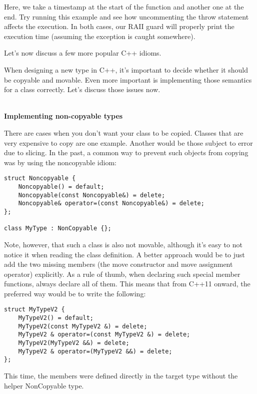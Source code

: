 Here, we take a timestamp at the start of the function and another one at the end. Try running this example and see how uncommenting the throw statement affects the execution. In both cases, our RAII guard will properly print the execution time (assuming the exception is caught somewhere).

Let's now discuss a few more popular C++ idioms.


When designing a new type in C++, it's important to decide whether it should be copyable and movable. Even more important is implementing those semantics for a class correctly. Let's discuss those issues now.

\hspace*{\fill} \\ %
\noindent
\textbf{Implementing non-copyable types}

There are cases when you don't want your class to be copied. Classes that are very expensive to copy are one example. Another would be those subject to error due to slicing. In the past, a common way to prevent such objects from copying was by using the noncopyable idiom:

\begin{lstlisting}[style=styleCXX]
struct Noncopyable {
	Noncopyable() = default;
	Noncopyable(const Noncopyable&) = delete;
	Noncopyable& operator=(const Noncopyable&) = delete;
};

class MyType : NonCopyable {};
\end{lstlisting}

Note, however, that such a class is also not movable, although it's easy to not notice it when reading the class definition. A better approach would be to just add the two missing members (the move constructor and move assignment operator) explicitly. As a rule of thumb, when declaring such special member functions, always declare all of them. This means that from C++11 onward, the preferred way would be to write the following:

\begin{lstlisting}[style=styleCXX]
struct MyTypeV2 {
	MyTypeV2() = default;
	MyTypeV2(const MyTypeV2 &) = delete;
	MyTypeV2 & operator=(const MyTypeV2 &) = delete;
	MyTypeV2(MyTypeV2 &&) = delete;
	MyTypeV2 & operator=(MyTypeV2 &&) = delete;
};
\end{lstlisting}

This time, the members were defined directly in the target type without the helper NonCopyable type.

